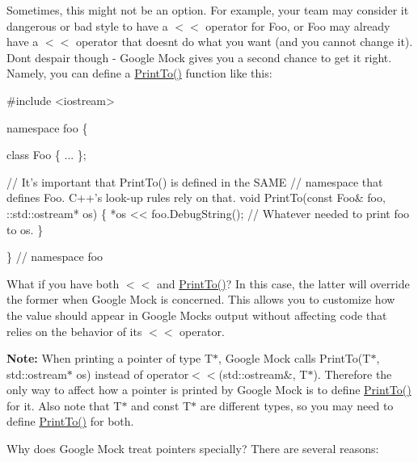 Sometimes, this might not be an option. For example, your team may consider it dangerous or bad style to have a {\ttfamily $<$$<$} operator for {\ttfamily Foo}, or {\ttfamily Foo} may already have a {\ttfamily $<$$<$} operator that doesn\textquotesingle{}t do what you want (and you cannot change it). Don\textquotesingle{}t despair though -\/ Google Mock gives you a second chance to get it right. Namely, you can define a {\ttfamily \hyperlink{namespacetesting_1_1internal_a8fd10cc30084c36a89c74868c8bd53f8}{Print\+To()}} function like this\+:


\begin{DoxyCode}
#include <iostream>

namespace foo \{

class Foo \{ ... \};

// It's important that PrintTo() is defined in the SAME
// namespace that defines Foo.  C++'s look-up rules rely on that.
void PrintTo(const Foo& foo, ::std::ostream* os) \{
  *os << foo.DebugString();  // Whatever needed to print foo to os.
\}

\}  // namespace foo
\end{DoxyCode}


What if you have both {\ttfamily $<$$<$} and {\ttfamily \hyperlink{namespacetesting_1_1internal_a8fd10cc30084c36a89c74868c8bd53f8}{Print\+To()}}? In this case, the latter will override the former when Google Mock is concerned. This allows you to customize how the value should appear in Google Mock\textquotesingle{}s output without affecting code that relies on the behavior of its {\ttfamily $<$$<$} operator.

{\bfseries Note\+:} When printing a pointer of type {\ttfamily T$\ast$}, Google Mock calls {\ttfamily Print\+To(\+T$\ast$, std\+::ostream$\ast$ os)} instead of {\ttfamily operator$<$$<$(std\+::ostream\&, T$\ast$)}. Therefore the only way to affect how a pointer is printed by Google Mock is to define {\ttfamily \hyperlink{namespacetesting_1_1internal_a8fd10cc30084c36a89c74868c8bd53f8}{Print\+To()}} for it. Also note that {\ttfamily T$\ast$} and {\ttfamily const T$\ast$} are different types, so you may need to define {\ttfamily \hyperlink{namespacetesting_1_1internal_a8fd10cc30084c36a89c74868c8bd53f8}{Print\+To()}} for both.

Why does Google Mock treat pointers specially? There are several reasons\+:


